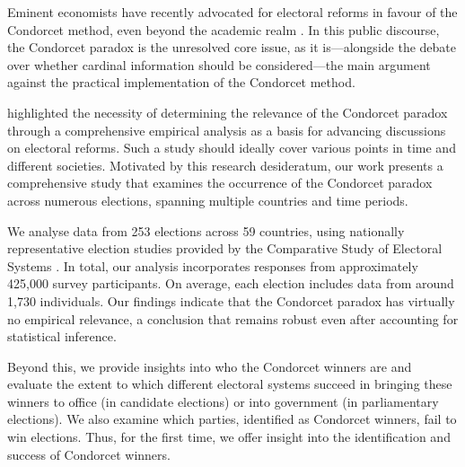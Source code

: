 \documentclass[12pt]{scrartcl}
\newcommand{\nbelections}{253 }
\newcommand{\nbcountries}{59 }
\begin{document}
Eminent economists have recently advocated for electoral reforms in favour of the Condorcet method, even beyond the academic realm \citep{Maskin2016, Maskin2017, Maskin2017a}. In this public discourse, the Condorcet paradox is the unresolved core issue, as it is—alongside the debate over whether cardinal information should be considered—the main argument against the practical implementation of the Condorcet method.

\citet[Ch.~10.2]{Sen2017} highlighted the necessity of determining the relevance of the Condorcet paradox through a comprehensive empirical analysis as a basis for advancing discussions on electoral reforms. Such a study should ideally cover various points in time and different societies. Motivated by this research desideratum, our work presents a comprehensive study that examines the occurrence of the Condorcet paradox across numerous elections, spanning multiple countries and time periods. 

We analyse data from \nbelections elections across \nbcountries countries, using nationally representative election studies provided by the Comparative Study of Electoral Systems \citep{CSES2020}. In total, our analysis incorporates responses from approximately 425,000 survey participants. On average, each election includes data from around 1,730 individuals. Our findings indicate that the Condorcet paradox has virtually no empirical relevance, a conclusion that remains robust even after accounting for statistical inference. 

Beyond this, we provide insights into who the Condorcet winners are and evaluate the extent to which different electoral systems succeed in bringing these winners to office (in candidate elections) or into government (in parliamentary elections). We also examine which parties, identified as Condorcet winners, fail to win elections. Thus, for the first time, we offer insight into the identification and success of Condorcet winners.
\end{document}
